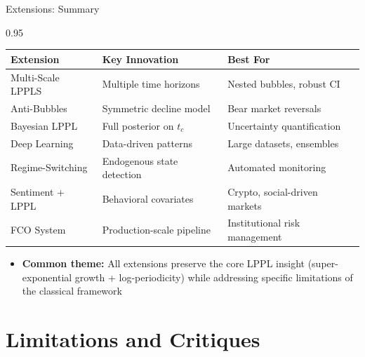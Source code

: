 \documentclass[9pt, aspectratio=169, t]{beamer}
\begin{document}
\begin{frame}{Extensions: Summary}
    \begin{cminipage}{0.95\textwidth}
    {\footnotesize
    \begin{center}
        \begin{tabular}{p{3.5cm}p{4cm}p{4.5cm}}
            \toprule
            \textbf{Extension} & \textbf{Key Innovation} & \textbf{Best For} \\
            \midrule
            Multi-Scale LPPLS & Multiple time horizons & Nested bubbles, robust CI \\
            \addlinespace
            Anti-Bubbles & Symmetric decline model & Bear market reversals \\
            \addlinespace
            Bayesian LPPL & Full posterior on $t_c$ & Uncertainty quantification \\
            \addlinespace
            Deep Learning & Data-driven patterns & Large datasets, ensembles \\
            \addlinespace
            Regime-Switching & Endogenous state detection & Automated monitoring \\
            \addlinespace
            Sentiment + LPPL & Behavioral covariates & Crypto, social-driven markets \\
            \addlinespace
            FCO System & Production-scale pipeline & Institutional risk management \\
            \bottomrule
        \end{tabular}
    \end{center}

    \vspace{1mm}
    \begin{itemize}\setlength{\itemsep}{0pt}
        \item \textbf{Common theme:} All extensions preserve the core LPPL insight (super-exponential growth + log-periodicity) while addressing specific limitations of the classical framework
    \end{itemize}
    }
    \end{cminipage}
\end{frame}

\section{Limitations and Critiques}
\end{document}
